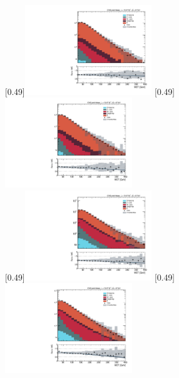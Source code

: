 \begin{figure}[p!] \centering
    [0.49\textwidth]{\includegraphics[width=0.49\textwidth,angle=-90,origin=c]{annexes/figs/higgs/data_mc/2-btag/semimu/MET_reco_fullsel.pdf}} \hfill
    [0.49\textwidth]{\includegraphics[width=0.49\textwidth,angle=-90,origin=c]{annexes/figs/higgs/data_mc/2-btag/semie/MET_reco_fullsel.pdf}} \\ \vspace{5mm}
    [0.49\textwidth]{\includegraphics[width=0.49\textwidth,angle=-90,origin=c]{annexes/figs/higgs/data_mc/1-btag/semimu/MET_reco_fullsel.pdf}} \hfill
    [0.49\textwidth]{\includegraphics[width=0.49\textwidth,angle=-90,origin=c]{annexes/figs/higgs/data_mc/1-btag/semie/MET_reco_fullsel.pdf}}

\end{figure}
